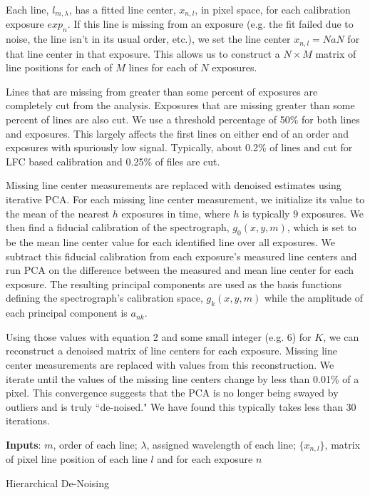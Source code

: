 \documentclass[twocolumn]{aastex63}
\begin{document}
Each line, $l_{m,\lambda}$, has a fitted line center, $x_{n,l}$, in pixel space, for each calibration exposure $exp_n$.  If this line is missing from an exposure (e.g. the fit failed due to noise, the line isn't in its usual order, etc.), we set the line center $x_{n,l} = NaN$ for that line center in that exposure.  This allows us to construct a $N \times M$ matrix of line positions for each of $M$ lines for each of $N$ exposures.

Lines that are missing from greater than some percent of exposures are completely cut from the analysis.  Exposures that are missing greater than some percent of lines are also cut.  We use a threshold percentage of 50\% for both lines and exposures.  This largely affects the first lines on either end of an order and exposures with spuriously low signal.  Typically, about 0.2\% of lines and cut for LFC based calibration and 0.25\% of files are cut.

Missing line center measurements are replaced with denoised estimates using iterative PCA.  For each missing line center measurement, we initialize its value to the mean of the nearest $h$ exposures in time, where $h$ is typically $9$ exposures.  We then find a fiducial calibration of the spectrograph,  $g_0(x,y,m)$, which is set to be the mean line center value for each identified line over all exposures.  We subtract this fiducial calibration from each exposure's measured line centers and run PCA on the difference between the measured and mean line center for each exposure.  The resulting principal components are used as the basis functions defining the spectrograph's calibration space, $g_k(x,y,m)$ while the amplitude of each principal component is $a_{nk}$.

Using those values with equation 2 and some small integer (e.g. 6) for $K$, we can reconstruct a denoised matrix of line centers for each exposure.  Missing line center measurements are replaced with values from this reconstruction.  We iterate until the values of the missing line centers change by less than 0.01\% of a pixel.  This convergence suggests that the PCA is no longer being swayed by outliers and is truly ``de-noised."   We have found this typically takes less than 30 iterations.

\begin{algorithm}
\SetAlgoLined
\textbf{Inputs}: $m$, order of each line; $\lambda$, assigned wavelength of each line; $\{x_{n,l}\} $, matrix of pixel line position of each line $l$ and for each exposure $n$\;
\caption{Hierarchical De-Noising}
\end{algorithm}
\end{document}
